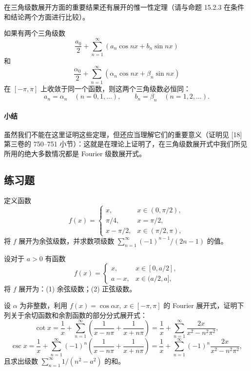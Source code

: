 在三角级数展开方面的重要结果还有展开的惟一性定理（请与命题 15.2.3 在条件和结论两个方面进行比较）。

\begin{xproposition}[15.2.12（Cantor 定理）]
如果有两个三角级数
\[
  \frac{a_0}{2}+\sum_{n=1}^{\infty}(a_n\cos nx+b_n\sin nx)
\]
和
\[
  \frac{\alpha_0}{2}+\sum_{n=1}^{\infty}(\alpha_n\cos nx+\beta_n\sin nx)
\]
在 $[-\pi,\pi]$ 上收敛于同一个函数，则这两个三角级数必恒同：
\[
  a_n=\alpha_n\quad(n=0,1,\ldots),\qquad
  b_n=\beta_n\quad(n=1,2,\ldots).
\]
\end{xproposition}

\paragraph{小结}
虽然我们不能在这里证明这些定理，但还应当理解它们的重要意义（证明见 [18] 第三卷的 750--751 小节）：这就是在理论上证明了，在三角级数展开式中我们所见所用的绝大多数情况都是 Fourier 级数展开式。

\subsection{练习题}

\begin{xexercise}[1]
定义函数
  \[
    f(x)=\begin{cases}
      x,&x\in(0,\pi/2),\\
      \pi/4,&x=\pi/2,\\
      x-\pi/2,&x\in(\pi/2,\pi),
    \end{cases}
  \]
  将 $f$ 展开为余弦级数，并求数项级数 $\sum_{n=1}^{\infty}(-1)^{n-1}/(2n-1)$ 的值。
\end{xexercise}

\begin{xexercise}[2]
设对于 $a>0$ 有函数
  \[
    f(x)=\begin{cases}
      x,&x\in[0,a/2],\\
      a-x,&x\in(a/2,a],
    \end{cases}
  \]
  将 $f$ 展开为：(1) 余弦级数；(2) 正弦级数。
\end{xexercise}

\begin{xexercise}[3]
设 $\alpha$ 为非整数，利用 $f(x)=\cos\alpha x,\ x\in[-\pi,\pi]$ 的 Fourier 展开式，证明下列关于余切函数和余割函数的部分分式展开式：
  \[
    \cot x=\frac1x+\sum_{n=1}^{\infty}\left(\frac1{x-n\pi}+\frac1{x+n\pi}\right)
    =\frac1x+\sum_{n=1}^{\infty}\frac{2x}{x^2-n^2\pi^2},
  \]
  \[
    \csc x=\frac1x+\sum_{n=1}^{\infty}(-1)^n\left(\frac1{x-n\pi}+\frac1{x+n\pi}\right)
    =\frac1x+\sum_{n=1}^{\infty}(-1)^n\frac{2x}{x^2-n^2\pi^2},
  \]
  且求出级数 $\sum_{n=1}^{\infty}1/(n^2-a^2)$ 的和。
\end{xexercise}

